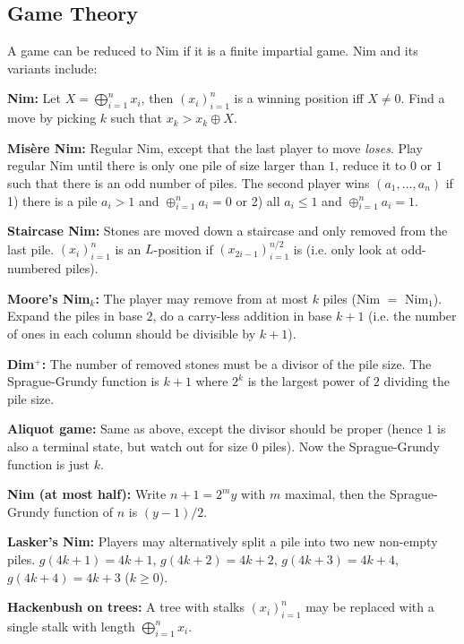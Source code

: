 \subsection{Game Theory}
	A game can be reduced to Nim if it is a finite impartial game.
	Nim and its variants include:
	\begin{myitemize}
		\item \textbf{Nim:} Let $X = \bigoplus_{i=1}^n x_i$, then $(x_i)_{i=1}^n$ is a winning position iff $X\neq 0$. Find a move by picking $k$ such that $x_k > x_k \oplus X$.
		\item \textbf{Mis\`{e}re Nim:} Regular Nim, except that the last player to move \textit{loses}. Play regular Nim until there is only one pile of size larger than $1$, reduce it to $0$ or $1$ such that there is an odd number of piles. The second player wins $(a_1, \dots, a_n)$ if 1) there is a pile $a_i > 1$ and $\oplus_{i=1}^{n} a_i = 0$ or 2) all $a_i \leq 1$ and $\oplus_{i=1}^{n} a_i = 1$.
		\item \textbf{Staircase Nim:} Stones are moved down a staircase and only removed from the last pile. $(x_i)_{i=1}^n$ is an $L$-position if $(x_{2i-1})_{i=1}^{n/2}$ is (i.e. only look at odd-numbered piles).
		\item \textbf{Moore's Nim$_k$:} The player may remove from at most $k$ piles (Nim $=$ Nim$_1$). Expand the piles in base $2$, do a carry-less addition in base $k+1$ (i.e. the number of ones in each column should be divisible by $k+1$).
		\item \textbf{Dim$^+$:} The number of removed stones must be a divisor of the pile size. The Sprague-Grundy function is $k+1$ where $2^k$ is the largest power of $2$ dividing the pile size.
		\item \textbf{Aliquot game:} Same as above, except the divisor should be proper (hence $1$ is also a terminal state, but watch out for size $0$ piles). Now the Sprague-Grundy function is just $k$.
		\item \textbf{Nim (at most half):} Write $n+1 = 2^my$ with $m$ maximal, then the Sprague-Grundy function of $n$ is $(y - 1) / 2$.
		\item \textbf{Lasker's Nim:} Players may alternatively split a pile into two new non-empty piles. $g(4k+1) = 4k+1$, $g(4k+2) = 4k+2$, $g(4k+3) = 4k+4$, $g(4k+4) = 4k+3$ ($k\geq 0$).
		\item \textbf{Hackenbush on trees:} A tree with stalks $(x_i)_{i=1}^n$ may be replaced with a single stalk with length $\bigoplus_{i=1}^n x_i$.
	\end{myitemize}

